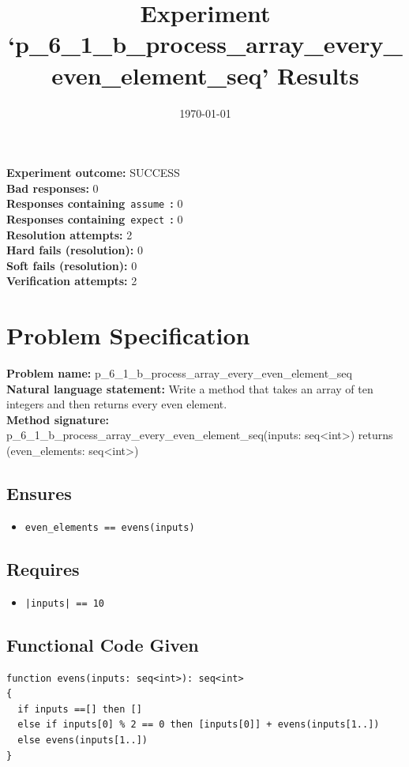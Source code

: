 \documentclass{article}
\begin{document}
\title{Experiment `p\_6\_1\_b\_process\_array\_every\_even\_element\_seq' Results}
\author{\today}
\date{}
\maketitle
\textbf{Experiment outcome: }SUCCESS
\\\textbf{Bad responses: }0
\\\textbf{Responses containing}~\texttt{assume}~\textbf{: }0
\\\textbf{Responses containing}~\texttt{expect}~\textbf{: }0
\\\textbf{Resolution attempts: }2
\\\textbf{Hard fails (resolution): }0
\\\textbf{Soft fails (resolution): }0
\\\textbf{Verification attempts: }2
\section*{Problem Specification}
\textbf{Problem name: }p\_6\_1\_b\_process\_array\_every\_even\_element\_seq
\\\textbf{Natural language statement: }Write a method that takes an array of ten integers and then returns every even element.
\\\textbf{Method signature: }p\_6\_1\_b\_process\_array\_every\_even\_element\_seq(inputs: seq<int>) returns (even\_elements: seq<int>)
\subsection*{Ensures}
\begin{itemize}
\item \texttt{even\_elements == evens(inputs)}
\end{itemize}
\subsection*{Requires}
\begin{itemize}
\item \texttt{|inputs| == 10}
\end{itemize}
\subsection*{Functional Code Given}
\begin{lstlisting}
function evens(inputs: seq<int>): seq<int>
{
  if inputs ==[] then []
  else if inputs[0] % 2 == 0 then [inputs[0]] + evens(inputs[1..])
  else evens(inputs[1..])
}
\end{lstlisting}
\clearpage
\end{document}

